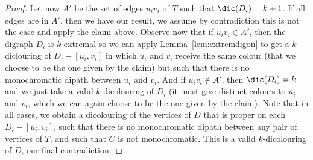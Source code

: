 \begin{proof}
Let now $A'$ be the set of edges $u_iv_i$ of $T$ such that $\dic(D_i)=k+1$. If all edges are in $A'$, then we have our result, we assume by contradiction this is not the case and apply the claim above. Observe now that if $u_iv_i\in A'$, then the digraph $D_i$ is $k$-extremal so we can apply Lemma~\ref{lem:extremdigon} to get a $k$-diclouring of $D_i-[u_i,v_i]$ in which $u_i$ and $v_i$ receive the same colour (that we choose to be the one given by the claim) but such that there is no monochromatic dipath between $u_i$ and $v_i$. And if $u_iv_i\not\in A'$, then  $\dic(D_i)=k$ and we just take a valid $k$-dicolouring of $D_i$ (it must give distinct colours to $u_i$ and $v_i$, which we can again choose to be the one given by the claim). Note that in all cases, we obtain a dicolouring of the vertices of $D$ that is proper on each $D_i-[u_i,v_i]$, such that there is no monochromatic dipath between any pair of vertices of $T$, and such that $C$ is not monochromatic. This is a valid $k$-dicolouring of $D$, our final contradiction.






 
 

\end{proof}
 

